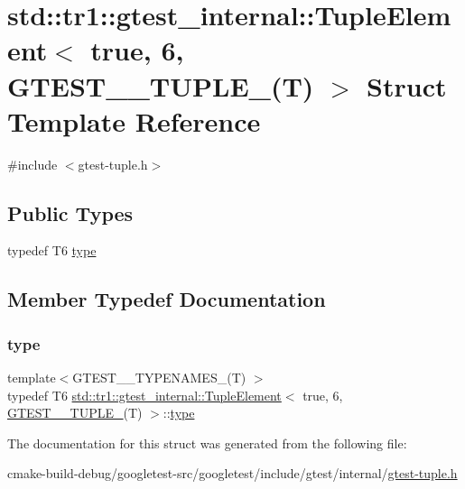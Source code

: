 \hypertarget{structstd_1_1tr1_1_1gtest__internal_1_1TupleElement_3_01true_00_016_00_01GTEST__10__TUPLE___07T_08_01_4}{}\section{std\+::tr1\+::gtest\+\_\+internal\+::Tuple\+Element$<$ true, 6, G\+T\+E\+S\+T\+\_\+\_\+\+T\+U\+P\+L\+E\+\_\+(T) $>$ Struct Template Reference}
\label{structstd_1_1tr1_1_1gtest__internal_1_1TupleElement_3_01true_00_016_00_01GTEST__10__TUPLE___07T_08_01_4}


{\ttfamily \#include $<$gtest-\/tuple.\+h$>$}

\subsection*{Public Types}
\begin{DoxyCompactItemize}
\item 
typedef T6 \mbox{\hyperlink{structstd_1_1tr1_1_1gtest__internal_1_1TupleElement_3_01true_00_016_00_01GTEST__10__TUPLE___07T_08_01_4_a929a5e4d1a751f3d1a5780643f69a121}{type}}
\end{DoxyCompactItemize}


\subsection{Member Typedef Documentation}
\mbox{\label{structstd_1_1tr1_1_1gtest__internal_1_1TupleElement_3_01true_00_016_00_01GTEST__10__TUPLE___07T_08_01_4_a929a5e4d1a751f3d1a5780643f69a121}} 
\subsubsection{\texorpdfstring{type}{type}}
{\footnotesize\ttfamily template$<$G\+T\+E\+S\+T\+\_\+\_\+\+T\+Y\+P\+E\+N\+A\+M\+E\+S\+\_\+(\+T) $>$ \\
typedef T6 \mbox{\hyperlink{structstd_1_1tr1_1_1gtest__internal_1_1TupleElement}{std\+::tr1\+::gtest\+\_\+internal\+::\+Tuple\+Element}}$<$ true, 6, \mbox{\hyperlink{namespacestd_1_1tr1_aa636d3269bf1f368a7bc09ff158bc482}{G\+T\+E\+S\+T\+\_\+\_\+\+T\+U\+P\+L\+E\+\_\+}}(T) $>$\+::\mbox{\hyperlink{structstd_1_1tr1_1_1gtest__internal_1_1TupleElement_3_01true_00_016_00_01GTEST__10__TUPLE___07T_08_01_4_a929a5e4d1a751f3d1a5780643f69a121}{type}}}



The documentation for this struct was generated from the following file\+:\begin{DoxyCompactItemize}
\item 
cmake-\/build-\/debug/googletest-\/src/googletest/include/gtest/internal/\mbox{\hyperlink{gtest-tuple_8h}{gtest-\/tuple.\+h}}\end{DoxyCompactItemize}
